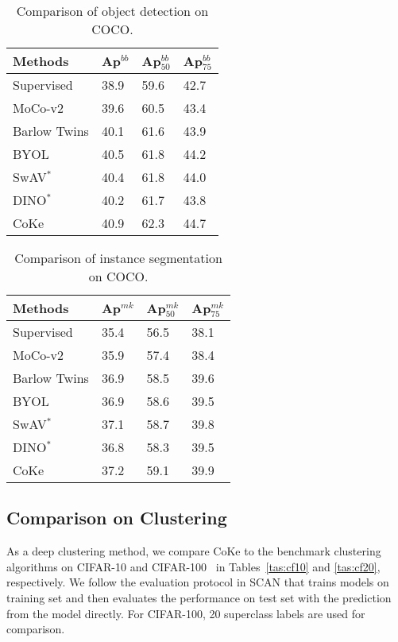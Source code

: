 \documentclass[10pt,twocolumn,letterpaper]{article}
\begin{document}
\begin{table}[!ht]
\centering
\begin{tabular}{|l|l|l|l|}\hline
Methods&Ap$^{bb}$&Ap$^{bb}_{50}$&Ap$^{bb}_{75}$\\\hline
Supervised&38.9&59.6&42.7 \\\hline
MoCo-v2&39.6&60.5&43.4 \\\hline
Barlow Twins&40.1&61.6&43.9 \\\hline
BYOL&40.5&61.8&44.2   \\\hline
SwAV$^*$&40.4&61.8&44.0 \\\hline
DINO$^*$&40.2&61.7&43.8\\\hline
CoKe&40.9&62.3&44.7\\\hline
\end{tabular}
\caption{Comparison of object detection on COCO. }\label{tas:cocob}
\end{table}

\begin{table}[!ht]
\centering
\begin{tabular}{|l|l|l|l|}\hline
Methods&Ap$^{mk}$&Ap$^{mk}_{50}$&Ap$^{mk}_{75}$\\\hline
Supervised&35.4&56.5&38.1 \\\hline
MoCo-v2&35.9&57.4&38.4\\\hline
Barlow Twins&36.9&58.5&39.6 \\\hline
BYOL&36.9&58.6&39.5   \\\hline
SwAV$^*$&37.1&58.7&39.8 \\\hline
DINO$^*$&36.8&58.3&39.5\\\hline
CoKe&37.2&59.1&39.9\\\hline
\end{tabular}
\caption{Comparison of instance segmentation on COCO.}\label{tas:cocom}
\end{table}


\subsection{Comparison on Clustering}
As a deep clustering method, we compare CoKe to the benchmark clustering algorithms on CIFAR-10 and CIFAR-100~\cite{krizhevsky2009learning} in Tables~\ref{tas:cf10} and \ref{tas:cf20}, respectively. We follow the evaluation protocol in SCAN that trains models on training set and then evaluates the performance on test set with the prediction from the model directly. For CIFAR-100, 20 superclass labels are used for comparison. 
\end{document}

